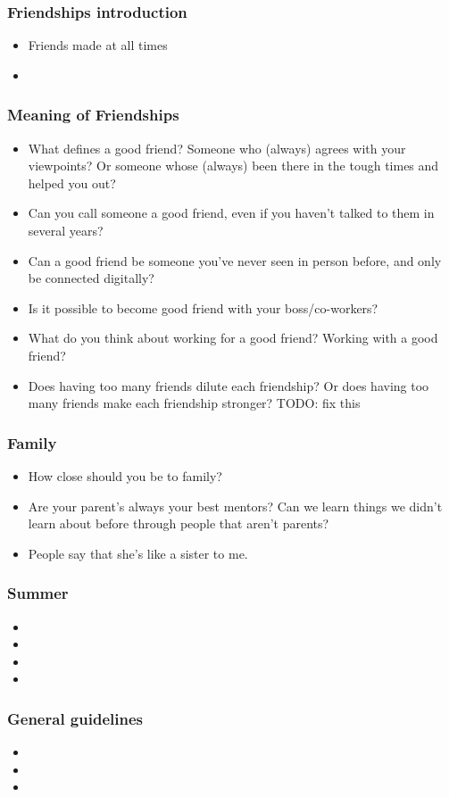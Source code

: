 \begin{frame} 
\frametitle {Friendships introduction} 

\begin{itemize}
\item Friends made at all times 
\item 
\end{itemize} 

\end{frame} 
\begin{frame}
\frametitle{Meaning of Friendships}
\begin{itemize}

\item What defines a good friend? Someone who (always) agrees with your viewpoints?  Or someone whose (always) been there in the tough times and helped you out?  

\item Can you call someone a good friend, even if you haven't talked to them in several years? 

\item Can a good friend be someone you've never seen in person before, and only be connected digitally? 

\item Is it possible to become good friend with your boss/co-workers? 

\item What do you think about working for a good friend? Working with a good friend? 

\item Does having too many friends dilute each friendship? Or does having too many friends make each friendship stronger?  TODO: fix this 



\end{itemize} 
\end{frame} 


\begin{frame}
\frametitle{Family}
\begin{itemize}
\item How close should you be to family? 
\item Are your parent's always your best mentors? Can we learn things we didn't learn about before through people that aren't parents? 
\item People say that she's like a sister to me. 
\end{itemize} 
\end{frame}

\begin{frame}
\frametitle{Summer}
\begin{itemize}
\tiny \item \tiny 
\item \tiny 
\item \tiny 
\item \tiny 
\end{itemize}
\end{frame}


\begin{frame}
\frametitle{General guidelines} 
\begin{itemize} 
\item 
\item 
\item 
\end{itemize} 
\end{frame} 




